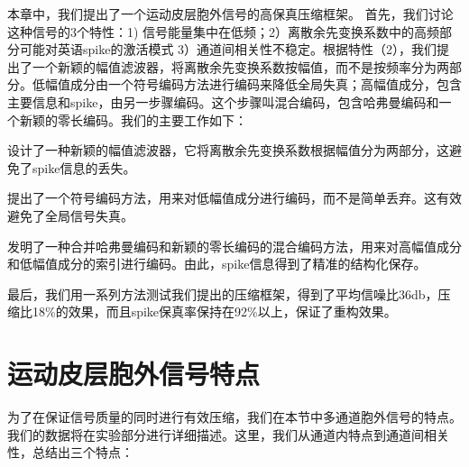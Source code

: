 本章中，我们提出了一个运动皮层胞外信号的高保真压缩框架。 首先，我们讨论这种信号的3个特性：1) 信号能量集中在低频；2）离散余先变换系数中的高频部分可能对英语spike的激活模式 3）通道间相关性不稳定。根据特性（2），我们提出了一个新颖的幅值滤波器，将离散余先变换系数按幅值，而不是按频率分为两部分。低幅值成分由一个符号编码方法进行编码来降低全局失真；高幅值成分，包含主要信息和spike，由另一步骤编码。这个步骤叫混合编码，包含哈弗曼编码和一个新颖的零长编码。我们的主要工作如下：

\begin{list}{-}
\item 设计了一种新颖的幅值滤波器，它将离散余先变换系数根据幅值分为两部分，这避免了spike信息的丢失。
\item 提出了一个符号编码方法，用来对低幅值成分进行编码，而不是简单丢弃。这有效避免了全局信号失真。 
\item 发明了一种合并哈弗曼编码和新颖的零长编码的混合编码方法，用来对高幅值成分和低幅值成分的索引进行编码。由此，spike信息得到了精准的结构化保存。
\end{list}




最后，我们用一系列方法测试我们提出的压缩框架，得到了平均信噪比36db，压缩比18\%的效果，而且spike保真率保持在92\%以上，保证了重构效果。





\section{运动皮层胞外信号特点}\label{sec:characteristic}


为了在保证信号质量的同时进行有效压缩，我们在本节中多通道胞外信号的特点。我们的数据将在实验部分进行详细描述。这里，我们从通道内特点到通道间相关性，总结出三个特点：

